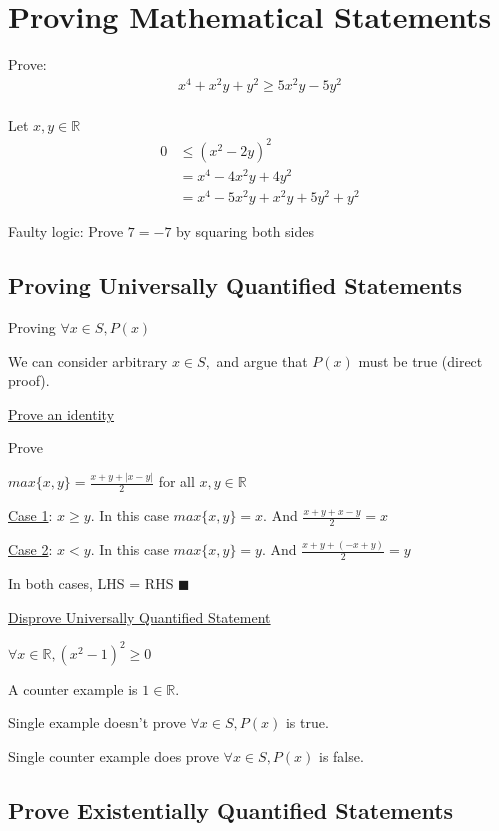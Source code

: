 \documentclass{article}
\begin{document}
\section{Proving Mathematical Statements}

Prove:
\begin{align*}
    x^4 + x^2y + y^2 \ge 5x^2y-5y^2 \\
\end{align*}

Let $x,y \in \mathbb{R}$
\begin{align*}
    0 &\le (x^2 - 2y)^2 \\
    &= x^4 - 4x^2y + 4y^2 \\
    &= x^4 - 5x^2y + x^2y + 5y^2 + y^2
\end{align*}


Faulty logic: Prove $7=-7$ by squaring both sides

\subsection{Proving Universally Quantified Statements}

Proving $\forall x \in S, P(x)$

We can consider arbitrary $x \in S,$ and argue that $P(x)$ must be true (direct proof). 

\underline{Prove an identity}

Prove

$max\{x,y\} = \frac{x+y+|x-y|}{2}$ for all $x,y\in \mathbb{R}$

\underline{Case 1}: $x \ge y$. In this case $max\{x,y\} = x$. And $\frac{x+y+x-y}{2} = x$

\underline{Case 2}: $ x < y$. In this case $max\{x,y\} = y$. And $\frac{x+y+(-x+y)}{2} = y$

In both cases, LHS = RHS $\blacksquare$

\underline{Disprove Universally Quantified Statement}

$\forall x \in \mathbb{R}, (x^2 - 1)^2 \ge 0$

A counter example is $1 \in \mathbb{R}$.

Single example doesn't prove $\forall x \in S, P(x)$ is true.

Single counter example does prove $\forall x \in S, P(x)$ is false.

\subsection{Prove Existentially Quantified Statements}
\end{document}
